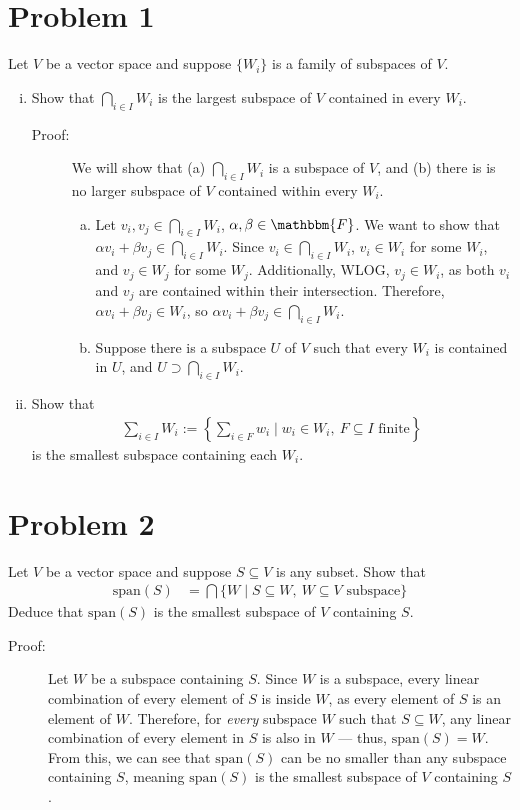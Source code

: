 \documentclass[8pt]{extarticle}
\title{}
\author{}
\date{}
\begin{document}
  \section{Problem 1}%
  Let $V$ be a vector space and suppose $\{W_i\}$ is a family of subspaces of $V$.
  \begin{enumerate}[(i)]
    \item Show that $\bigcap_{i\in I} W_i$ is the largest subspace of $V$ contained in every $W_i$.
    \begin{description}
      \item[Proof:] We will show that (a) $\bigcap_{i\in I} W_i$ is a subspace of $V$, and (b) there is is no larger subspace of $V$ contained within every $W_i$.
        \begin{enumerate}[(a)]
          \item Let $v_i, v_j\in \bigcap_{i\in I} W_i$, $\alpha,\beta \in \mathbbm{F}$. We want to show that $\alpha v_i + \beta v_j \in \bigcap_{i\in I}W_i$. Since $v_i\in \bigcap_{i\in I}W_i$, $v_i \in W_i$ for some $W_i$, and $v_j\in W_j$ for some $W_j$. Additionally, WLOG, $v_j\in W_i$, as both $v_i$ and $v_j$ are contained within their intersection. Therefore, $\alpha v_i + \beta v_j\in W_i$, so $\alpha v_i + \beta v_j\in \bigcap_{i\in I}W_i$.
          \item Suppose there is a subspace $U$ of $V$ such that every $W_i$ is contained in $U$, and $U \supset \bigcap_{i\in I}W_i$.
        \end{enumerate}
    \end{description}
    \item Show that
      \begin{align*}
        \sum_{i\in I}W_i := \left\{\sum_{i\in F}w_i \mid w_i\in W_i,~F\subseteq I \text{ finite}\right\}
      \end{align*}
      is the smallest subspace containing each $W_i$.
  \end{enumerate}
  \section{Problem 2}%
  Let $V$ be a vector space and suppose $S\subseteq V$ is any subset. Show that
  \begin{align*}
    \text{span}(S) &= \bigcap \{W\mid S\subseteq W,~W\subseteq V \text{ subspace}\}
  \end{align*}
  Deduce that $\text{span}(S)$ is the smallest subspace of $V$ containing $S$.
  \begin{description}
    \item[Proof:] Let $W$ be a subspace containing $S$. Since $W$ is a subspace, every linear combination of every element of $S$ is inside $W$, as every element of $S$ is an element of $W$. Therefore, for \textit{every} subspace $W$ such that $S\subseteq W$, any linear combination of every element in $S$ is also in $W$ --- thus, $\text{span}(S) = W$.\\

      From this, we can see that $\text{span}(S)$ can be no smaller than any subspace containing $S$, meaning $\text{span}(S)$ is the smallest subspace of $V$ containing $S$.
  \end{description}
\end{document}

